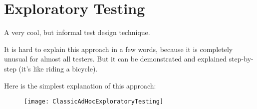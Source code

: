 \section{Exploratory Testing}
\label{sec:Exploratory Testing}

A very cool, but informal test design technique.

It is hard to explain this approach in a few words, because it is completely unusual for almost all testers. But it can be demonstrated and explained step-by-step (it's like riding a bicycle).

Here is the simplest explanation of this approach:

\begin{figure}[!h]
\centering
\texttt{[image: ClassicAdHocExploratoryTesting]}
\caption{}
\label{fig:ClassicAdHocExploratoryTesting}
\end{figure}